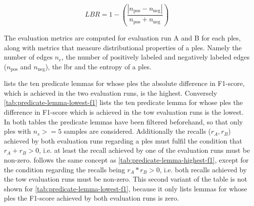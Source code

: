 \documentclass[11pt]{scrreprt}
\begin{document}
{\begin{equation}
LBR = 1 - \left(\frac{\left|n_{\text{pos}} - n_{\text{neg}}\right|}{n_{\text{pos}} + n_{\text{neg}}}\right)
\label{eq:label-balance-ratio}
\end{equation}

The evaluation metrics are computed for evaluation run A and B for each \gls{ples}, along with metrics that measure distributional properties of a \gls{ples}. Namely the number of edges \(n_e\), the number of positively labeled and negatively labeled edges (\(n_\text{pos}\) and \(n_\text{neg}\)), the \gls{lbr}  and the entropy of a \gls{ples}.

 lists the ten predicate lemmas for whose \gls{ples} the absolute difference in F1-score, which is achieved in the two evaluation runs, is the highest. Conversely \cref{tab:predicate-lemma-lowest-f1} lists the ten predicate lemma for whose \gls{ples} the difference in F1-score which is achieved in the tow evaluation runs is the lowest. In both tables the predicate lemmas have been filtered beforehand, so that only \gls{ples} with \(n_s >= 5\) samples are considered. Additionally the recalls (\(r_A, r_B\)) achieved by both evaluation runs regarding a \gls{ples} must fulfil the condition that \(r_A + r_B > 0\), i.e. at least the recall achieved by one of the evaluation runs must be non-zero.  follows the same concept as \cref{tab:predicate-lemma-highest-f1}, except for the condition regarding the recalls being \(r_A * r_B > 0\), i.e. both recalls achieved by the tow evaluation runs must be non-zero. This second variant of the table is not shown for \cref{tab:predicate-lemma-lowest-f1}, because it only lists lemmas for whose \gls{ples} the F1-score achieved by both evaluation runs is zero.



}
\end{document}
